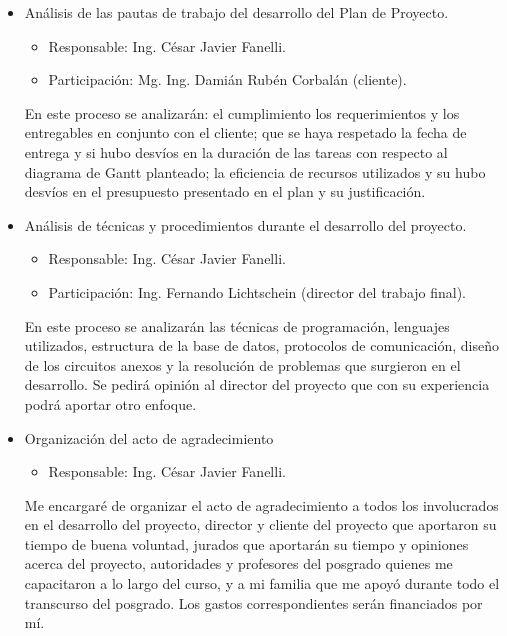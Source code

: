 \documentclass[
11pt, %
]{charter}
\begin{document}
\begin{itemize}
	\item Análisis de las pautas de trabajo del desarrollo del Plan de Proyecto.
	\begin{itemize}	
		\item Responsable: Ing. César Javier Fanelli.
		\item Participación: Mg. Ing. Damián Rubén Corbalán (cliente).
	\end{itemize}	
	En este proceso se analizarán: el cumplimiento los requerimientos y los entregables en conjunto con el cliente; que se haya respetado la fecha de entrega y si hubo desvíos en la duración de las tareas con respecto al diagrama de Gantt planteado; la eficiencia de recursos utilizados y su hubo desvíos en el presupuesto presentado en el plan y su justificación.
	\item Análisis de técnicas y procedimientos durante el desarrollo del proyecto.
	\begin{itemize}	
		\item Responsable: Ing. César Javier Fanelli.
		\item Participación: Ing. Fernando Lichtschein (director del trabajo final).
	\end{itemize}
	En este proceso se analizarán las técnicas de programación, lenguajes utilizados, estructura de la base de datos, protocolos de comunicación, diseño de los circuitos anexos y la resolución de problemas que surgieron en el desarrollo. Se pedirá opinión al director del proyecto que con su experiencia podrá aportar otro enfoque.
	\item Organización del acto de agradecimiento
	\begin{itemize}	
		\item Responsable: Ing. César Javier Fanelli.
	\end{itemize}
	Me encargaré de organizar el acto de agradecimiento a todos los involucrados en el desarrollo del proyecto, director y cliente del proyecto que aportaron su tiempo de buena voluntad, jurados que aportarán su tiempo y opiniones acerca del proyecto, autoridades y profesores del posgrado quienes me capacitaron a lo largo del curso, y a mi familia que me apoyó durante todo el transcurso del posgrado. Los gastos correspondientes serán financiados por mí.
\end{itemize}
\end{document}
